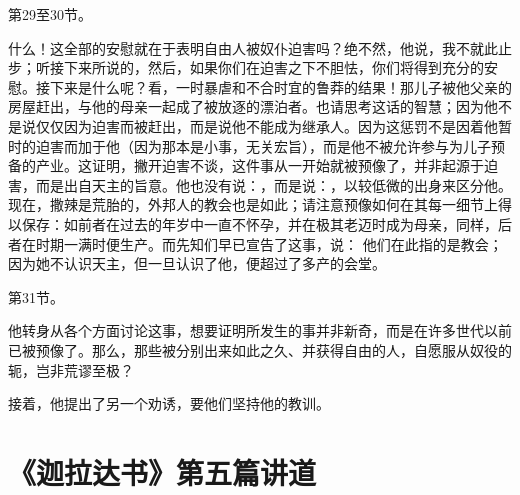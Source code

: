 第29至30节。\par

什么！这全部的安慰就在于表明自由人被奴仆迫害吗？绝不然，他说，我不就此止步；听接下来所说的，然后，如果你们在迫害之下不胆怯，你们将得到充分的安慰。接下来是什么呢？看，一时暴虐和不合时宜的鲁莽的结果！那儿子被他父亲的房屋赶出，与他的母亲一起成了被放逐的漂泊者。也请思考这话的智慧；因为他不是说仅仅因为迫害而被赶出，而是说他不能成为继承人。因为这惩罚不是因着他暂时的迫害而加于他（因为那本是小事，无关宏旨），而是他不被允许参与为儿子预备的产业。这证明，撇开迫害不谈，这件事从一开始就被预像了，并非起源于迫害，而是出自天主的旨意。他也没有说：，而是说：，以较低微的出身来区分他。现在，撒辣是荒胎的，外邦人的教会也是如此；请注意预像如何在其每一细节上得以保存：如前者在过去的年岁中一直不怀孕，并在极其老迈时成为母亲，同样，后者在时期一满时便生产。而先知们早已宣告了这事，说： 他们在此指的是教会；因为她不认识天主，但一旦认识了他，便超过了多产的会堂。\par

第31节。\par

他转身从各个方面讨论这事，想要证明所发生的事并非新奇，而是在许多世代以前已被预像了。那么，那些被分别出来如此之久、并获得自由的人，自愿服从奴役的轭，岂非荒谬至极？\par

接着，他提出了另一个劝诱，要他们坚持他的教训。\par



\section{《迦拉达书》第五篇讲道}

